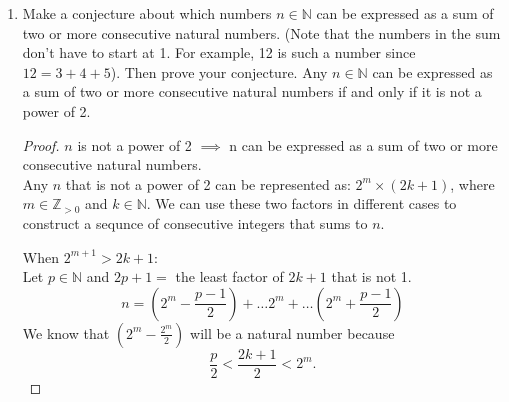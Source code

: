 \documentclass[12pt,a4paper,reqno,parskip=full]{amsart}
\numberwithin{equation}{section}
\theoremstyle{plain}
\theoremstyle{definition}
\begin{document}
\begin{enumerate}
\begin{proof}
          Assume $A$, $B$, $C$, and $D$ are all non-empty have no duplicate elements between them.
          \[|(A\times B)\cup(C\times D)| = |A| * |B| + |C| * |D|\]
          \begin{align*}
            |(A\cup C)\times(B\cup D)| & = (|A| + |C|) * (|B| + |D|)                     \\
                                       & = |A| * |B| + |C| * |D| + |A| * |D| + |B| * |C| \\
          \end{align*}
          \begin{align*}
            |A| * |B| + |C| * |D| & = |A| * |B| + |C| * |D| + |A| * |D| + |B| * |C| \\
            0                     & = |A| * |D| + |B| * |C|
          \end{align*}
          Clearly, the conjecture does not hold in this case.
        \end{proof}
  \item Make a conjecture about which numbers $n\in\mathbb{N}$ can be expressed as a sum of two or
        more consecutive natural numbers. (Note that the numbers in the sum don't have to start at
        1. For example, 12 is such a number since $12=3+4+5$). Then prove your conjecture.
        \conjecture Any $n\in\mathbb{N}$ can be expressed as a sum of two or more consecutive
        natural numbers if and only if it is not a power of 2.
        \begin{proof}
          $n$ is not a power of 2 $\implies$
          n can be expressed as a sum of two or more consecutive natural numbers. \\
          Any $n$ that is not a power of 2 can be represented as: $2^m\times (2k + 1)$, where
          $m\in\mathbb{Z}_{>0}$ and $k\in\mathbb{N}$. We can use these two factors in different
          cases to construct a sequnce of consecutive integers that sums to $n$.

          When $2^{m + 1} > 2k + 1$: \\
          Let $p\in\mathbb{N}$ and $2p + 1 = $ the least factor of $2k + 1$ that is not 1.
          \[n = \left(2^m - \frac{p-1}{2}\right) +\dots 2^m+\dots \left(2^m + \frac{p-1}{2}\right)\]
          We know that $\displaystyle \left(2^m - \frac{2^m}{2}\right)$ will be a natural number
          because \[\frac{p}{2} < \frac{2k + 1}{2} < 2^m.\]


\end{proof}
\end{enumerate}
\end{document}
